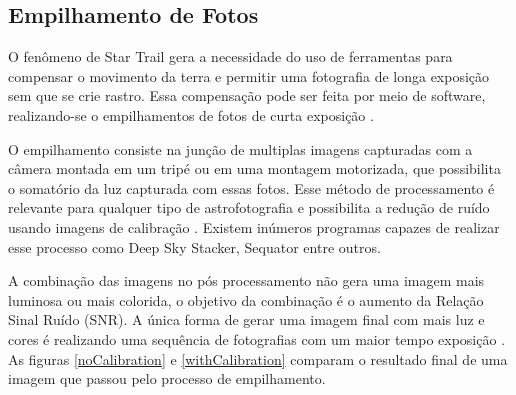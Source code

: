 \subsection{Empilhamento de Fotos}

O fenômeno de Star Trail gera a necessidade do uso de ferramentas para compensar o movimento da terra e permitir uma fotografia de longa exposição sem que se crie rastro. Essa compensação pode ser feita por meio de software, realizando-se o empilhamentos de fotos de curta exposição \cite{livro:astropratica}.

O empilhamento consiste na junção de multiplas imagens capturadas com a câmera montada em um tripé ou em uma montagem motorizada, que possibilita o somatório da luz capturada com essas fotos. Esse método de processamento é relevante para qualquer tipo de astrofotografia e possibilita a redução de ruído usando imagens de calibração \cite{book:bbcsky}. Existem inúmeros programas capazes de realizar esse processo como Deep Sky Stacker, Sequator entre outros.

A combinação das imagens no pós processamento não gera uma imagem mais luminosa ou mais colorida, o objetivo da combinação é o aumento da Relação Sinal Ruído (SNR). A única forma de gerar uma imagem final com mais luz e cores é realizando uma sequência de fotografias com um maior tempo exposição \cite{man:deepskystackerBetterImages}. As figuras \ref{noCalibration} e \ref{withCalibration} comparam o resultado final de uma imagem que passou pelo processo de empilhamento. 

